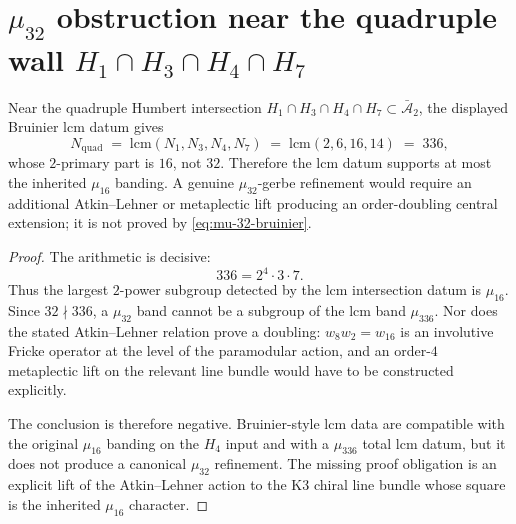 \section{$\mu_{32}$ obstruction near the quadruple wall
$H_1 \cap H_3 \cap H_4 \cap H_7$}
\label{sec:mu-32-refinement}

\begin{theorem}
\label{thm:mu-32-refinement}
%
%
%
Near the quadruple Humbert intersection
$H_1 \cap H_3 \cap H_4 \cap H_7 \subset \bar{\mathcal A}_2$, the
displayed Bruinier lcm datum gives
\begin{equation}\label{eq:mu-32-bruinier}
 N_{\mathrm{quad}}
 \;=\;
 \mathrm{lcm}(N_1, N_3, N_4, N_7)
 \;=\;
 \mathrm{lcm}(2, 6, 16, 14) \;=\; 336,
\end{equation}
whose $2$-primary part is $16$, not $32$. Therefore the lcm datum
supports at most the inherited $\mu_{16}$ banding. A genuine
$\mu_{32}$-gerbe refinement would require an additional
Atkin--Lehner or metaplectic lift producing an order-doubling
central extension; it is not proved by
\eqref{eq:mu-32-bruinier}.
\end{theorem}

\begin{proof}
The arithmetic is decisive:
\[
 336 = 2^4\cdot 3\cdot 7.
\]
Thus the largest $2$-power subgroup detected by the lcm
intersection datum is $\mu_{16}$. Since $32\nmid 336$, a
$\mu_{32}$ band cannot be a subgroup of the lcm band
$\mu_{336}$. Nor does the stated Atkin--Lehner relation prove a
doubling: $w_8w_2=w_{16}$ is an involutive Fricke operator at the
level of the paramodular action, and an order-$4$ metaplectic lift
on the relevant line bundle would have to be constructed explicitly.

The conclusion is therefore negative. Bruinier-style lcm
data are compatible with the original $\mu_{16}$ banding on
the $H_4$ input and with a $\mu_{336}$ total lcm datum, but it does
not produce a canonical $\mu_{32}$ refinement. The missing proof
obligation is an explicit lift of the Atkin--Lehner action to the
K3 chiral line bundle whose square is the inherited $\mu_{16}$
character.
\end{proof}

